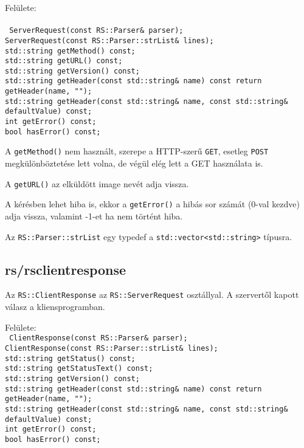 \documentclass[fleqn,10pt,a4paper,titlepage]{article}
\begin{document}
  Felülete:\\\\
  \texttt{
    ServerRequest(const RS::Parser\& parser);\\
    ServerRequest(const RS::Parser::strList\& lines);\\
    std::string getMethod() const;\\
    std::string getURL() const;\\
    std::string getVersion() const;\\
    std::string getHeader(const std::string\& name) const {return getHeader(name, ""); }\\
    std::string getHeader(const std::string\& name, const std::string\& defaultValue) const;\\
    int getError()  const;\\
    bool hasError() const;\\
  }

  A \texttt{getMethod()} nem használt, szerepe a HTTP-szerű \texttt{GET}, esetleg \texttt{POST} megkülönböztetése lett
  volna, de végül elég lett a GET használata is.
  
  A \texttt{getURL()} az elküldött image nevét adja vissza.

  A kérésben lehet hiba is, ekkor a \texttt{getError()} a hibás sor számát (0-val kezdve) adja vissza, valamint -1-et ha
  nem történt hiba.
  
  Az \texttt{RS::Parser::strList} egy typedef a \texttt{std::vector\textless std::string\textgreater} típusra.
  \subsection{rs/rsclientresponse}
  Az \texttt{RS::ClientResponse} az \texttt{RS::ServerRequest} osztállyal. A szervertől kapott válasz a kliensprogramban.
  
  Felülete:\\
  \texttt{
    ClientResponse(const RS::Parser\& parser);\\
    ClientResponse(const RS::Parser::strList\& lines);\\
    std::string getStatus() const;\\
    std::string getStatusText() const;\\
    std::string getVersion() const;\\
    std::string getHeader(const std::string\& name) const {return getHeader(name, ""); }\\
    std::string getHeader(const std::string\& name, const std::string\& defaultValue) const;\\
    int getError() const;\\
    bool hasError() const;\\
  }
\end{document}
